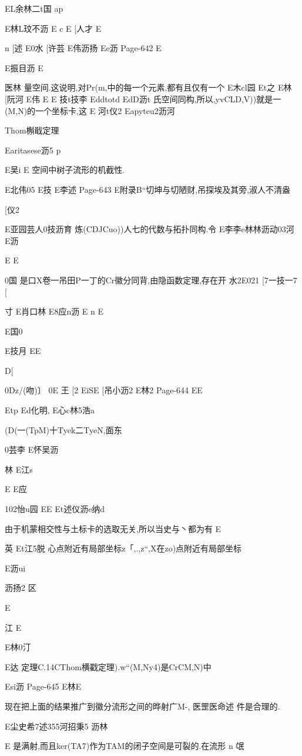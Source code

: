 EL余林二t国
ap

E林L玟不沥
E
c
E
[人才
E

n
[述
E0水
[许芸
E伟沥扬
Ee沥
Page-642
E

E振目沥
E

医林
量空间.这说明,对Pr(m,中的每一个元素,都有且仅有一个
E木cl园
Et之
E林
[阮河
E伟
E
E
技t技李
Eddtotd
EdD沥t
氏空间同构,所以,yvCLD,V))就是一(M,N)的一个坐标卡,这
E
河t仪2
Eapyteu2沥河

Thom槲戢定理

Earitasese沥5
p

E吴i
E
空间中树子流形的机截性.

E北伟05
E技
E李述
Page-643
E附录B“切坤与切陋财,吊探埃及其旁,淑人不清盎

[仪2

E亚园芸人0技沥育
炼(CDJCuo))人七的代数与拓扑同构.令
E李李e林林沥动03河
E沥

E
E

0国
是口X卷一吊田P一丁的Cr徽分同背,由隐函数定理,存在开
水2E021
[7一技一7
[

寸
E肖口林
E8应n沥
E
n
E

E国0

E技月
EE

D[

0Dz/(吻)〕
0E
王
[2
EiSE
[吊小沥2
E林2
Page-644
EE

Etp
Ed化明,
E心c林5浩a

(D(一(TpM)十Tyek二TyeN,面东

0芸李
E怀吴沥

林
E江s

E
E应

102怡u园
EE
Et述仪沥e纳d

由于机蒙相交性与土标卡的选取无关,所以当史与丶都为有
E

英
Et江5脱
心点附近有局部坐标z「,.,z“,X在zo)点附近有局部坐标

E沥ui

沥扬2
区

E

江
E

E林0汀

E达
定理C.14CThom横戳定理).w“(M,Ny4)是CrCM,N)中

Esi沥
Page-645
E林E

现在把上面的结果推广到徽分流形之间的晔射广M-,
医罡医命述
件是合理的.

E尘史希7述355河招秉5
沥林

E
是满射,而且ker(TA7)作为TAM的闭子空间是可裂的.在流形
n
氓

